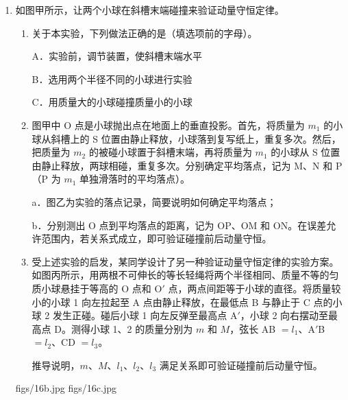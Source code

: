 \documentclass[\gkver]{gaokaozhenti}
\begin{document}
\begin{enumerate}
{故选 BC。

（3）由闭合电路欧姆定律得 $E = U + \frac{U}{R}r$，解得 $U = -\frac{U}{R}r + E$

结合题图 2 可得 $E = 1.0\UV$，$r = \frac{1.0 - 0.4}{180\times10^{-6}}\UO \approx 3.3\UkO$
}

\item
如图甲所示，让两个小球在斜槽末端碰撞来验证动量守恒定律。
\begin{enumerate}
	\item
	关于本实验，下列做法正确的是（填选项前的字母）。

	A．实验前，调节装置，使斜槽末端水平

	B．选用两个半径不同的小球进行实验

	C．用质量大的小球碰撞质量小的小球
	\item
	图甲中 O 点是小球抛出点在地面上的垂直投影。首先，将质量为 $m_{1}$ 的小球从斜槽上的 S 位置由静止释放，小球落到复写纸上，重复多次。然后，把质量为 $m_{2}$ 的被碰小球置于斜槽末端，再将质量为 $m_{1}$ 的小球从 S 位置由静止释放，两球相碰，重复多次。分别确定平均落点，记为 M、N 和 P（P 为 $m_{1}$ 单独滑落时的平均落点）。

	a．图乙为实验的落点记录，简要说明如何确定平均落点；

	b．分别测出 O 点到平均落点的距离，记为 OP、OM 和 ON。在误差允许范围内，若关系式成立，即可验证碰撞前后动量守恒。
	\item
	受上述实验的启发，某同学设计了另一种验证动量守恒定律的实验方案。如图丙所示，用两根不可伸长的等长轻绳将两个半径相同、质量不等的匀质小球悬挂于等高的 O 点和 O$'$ 点，两点间距等于小球的直径。将质量较小的小球 1 向左拉起至 A 点由静止释放，在最低点 B 与静止于 C 点的小球 2 发生正碰。碰后小球 1 向左反弹至最高点 A$'$，小球 2 向右摆动至最高点 D。测得小球 1、2 的质量分别为 $m$ 和 $M$，弦长 AB $= l_{1}$、A$'$B $= l_{2}$、CD $= l_{3}$。

	推导说明，$m$、$M$、$l_{1}$、$l_{2}$、$l_{3}$ 满足关系即可验证碰撞前后动量守恒。
\end{enumerate}

{figs/16b.jpg}
{figs/16c.jpg}
\end{enumerate}
\end{document}
